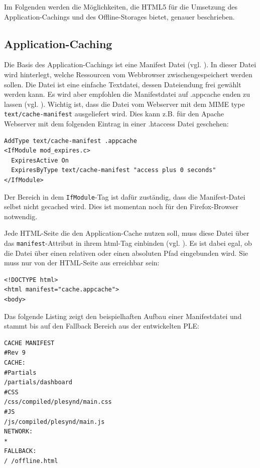 Im Folgenden werden die Möglichkeiten, die HTML5 für die Umsetzung des Application-Cachings und des Offline-Storages bietet, genauer beschrieben.

\subsection{Application-Caching}\label{section:appcache}
Die Basis des Application-Cachings ist eine Manifest Datei (vgl. \cite{Bidelman2010}). In dieser Datei wird hinterlegt, welche Ressourcen vom Webbrowser zwischengespeichert werden sollen. Die Datei ist eine einfache Textdatei, dessen Dateiendung frei gewählt werden kann. Es wird aber empfohlen die Manifestdatei auf .appcache enden zu lassen (vgl. \cite{W3C2012}). Wichtig ist, dass die Datei vom Webserver mit dem MIME type \texttt{text/cache-manifest} ausgeliefert wird. Dies kann z.B. für den  Apache Webserver mit dem folgenden Eintrag in einer .htaccess Datei geschehen:
\begin{lstlisting}
AddType text/cache-manifest .appcache
<IfModule mod_expires.c>
  ExpiresActive On
  ExpiresByType text/cache-manifest "access plus 0 seconds"
</IfModule>
\end{lstlisting}
Der Bereich in dem \texttt{IfModule}-Tag ist dafür zuständig, dass die Manifest-Datei selbst nicht gecached wird. Dies ist momentan noch für den Firefox-Browser notwendig.

Jede HTML-Seite die den Application-Cache nutzen soll, muss diese Datei über das \texttt{manifest}-Attribut in ihrem html-Tag einbinden (vgl. \cite{html5upandrunningchapter8}). Es ist dabei egal, ob die Datei über einen relativen oder einen absoluten Pfad eingebunden wird. Sie muss nur von der HTML-Seite aus erreichbar sein:
\begin{lstlisting}
<!DOCTYPE html>
<html manifest="cache.appcache">
<body>
\end{lstlisting}

Das folgende Listing zeigt den beispielhaften Aufbau einer Manifestdatei und stammt bis auf den Fallback Bereich aus der entwickelten PLE:
\begin{lstlisting}
CACHE MANIFEST
#Rev 9
CACHE:
#Partials
/partials/dashboard
#CSS
/css/compiled/plesynd/main.css
#JS
/js/compiled/plesynd/main.js
NETWORK:
*
FALLBACK:
/ /offline.html
\end{lstlisting}

